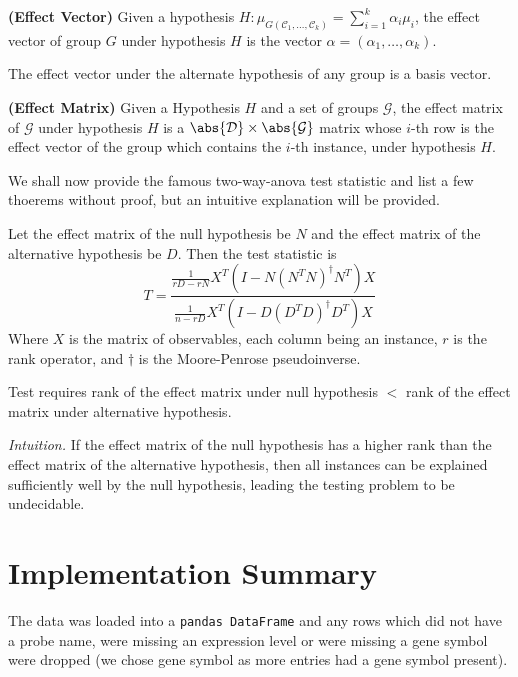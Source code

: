 \documentclass{article}
\begin{document}
\begin{definition}
    \textbf{(Effect Vector)} Given a hypothesis $H: \mu_{G(\mathcal{C}_1, \dots, \mathcal{C}_k)} = \sum_{i=1}^k \alpha_i \mu_i$, the effect vector of group $G$ under hypothesis $H$ is the vector $\alpha = (\alpha_1, \dots, \alpha_k)$.
\end{definition}
\begin{remark}
    The effect vector under the alternate hypothesis of any group is a basis vector.
\end{remark}
\begin{definition}
    \textbf{(Effect Matrix)} Given a Hypothesis $H$ and a set of groups $\mathcal{G}$, the effect matrix of $\mathcal{G}$ under hypothesis $H$ is a $\abs{\mathcal{D}} \times \abs{\mathcal{G}}$ matrix whose $i$-th row is the effect vector of the group which contains the $i$-th instance, under hypothesis $H$.
\end{definition}

We shall now provide the famous two-way-anova test statistic and list a few thoerems without proof, but an intuitive explanation will be provided.

Let the effect matrix of the null hypothesis be $N$ and the effect matrix of the alternative hypothesis be $D$. Then the test statistic is
\begin{equation}
    T = \frac{\frac{1}{rD - rN} X^T (I - N(N^T N)^\dagger N^T) X}{\frac{1}{n - rD} X^T (I - D(D^T D)^\dagger D^T) X}
\end{equation}
Where $X$ is the matrix of observables, each column being an instance, $r$ is the rank operator, and $\dagger$ is the Moore-Penrose pseudoinverse.

\begin{theorem}
    Test requires rank of the effect matrix under null hypothesis $<$ rank of the effect matrix under alternative hypothesis.
\end{theorem}
\textit{Intuition.} If the effect matrix of the null hypothesis has a higher rank than the effect matrix of the alternative hypothesis, then all instances can be explained sufficiently well by the null hypothesis, leading the testing problem to be undecidable.

\section{Implementation Summary}
The data was loaded into a \texttt{pandas DataFrame} and any rows which did not have a probe name, were missing an expression level or were missing a gene symbol were dropped (we chose gene symbol as more entries had a gene symbol present).
\end{document}
